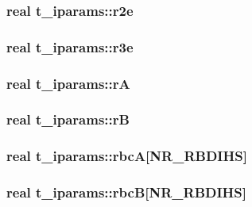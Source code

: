\hypertarget{uniont__iparams_a70a44f4e45a7d84efd330354ba816780}{
\subsubsection[{r2e}]{\setlength{\rightskip}{0pt plus 5cm}real {\bf t\-\_\-iparams\-::r2e}}}\label{uniont__iparams_a70a44f4e45a7d84efd330354ba816780}
\hypertarget{uniont__iparams_ad7f21f15de2058adad587fa20a745762}{
\subsubsection[{r3e}]{\setlength{\rightskip}{0pt plus 5cm}real {\bf t\-\_\-iparams\-::r3e}}}\label{uniont__iparams_ad7f21f15de2058adad587fa20a745762}
\hypertarget{uniont__iparams_a140d0cfa7716976087a09c992fce9826}{
\subsubsection[{r\-A}]{\setlength{\rightskip}{0pt plus 5cm}real {\bf t\-\_\-iparams\-::r\-A}}}\label{uniont__iparams_a140d0cfa7716976087a09c992fce9826}
\hypertarget{uniont__iparams_a201b81e15b8da67bf64b6fa4634df60d}{
\subsubsection[{r\-B}]{\setlength{\rightskip}{0pt plus 5cm}real {\bf t\-\_\-iparams\-::r\-B}}}\label{uniont__iparams_a201b81e15b8da67bf64b6fa4634df60d}
\hypertarget{uniont__iparams_ac5aa44c3cfa9ca81e5298d73ef1a2ba5}{
\subsubsection[{rbc\-A}]{\setlength{\rightskip}{0pt plus 5cm}real {\bf t\-\_\-iparams\-::rbc\-A}\mbox{[}{\bf \-N\-R\-\_\-\-R\-B\-D\-I\-H\-S}\mbox{]}}}\label{uniont__iparams_ac5aa44c3cfa9ca81e5298d73ef1a2ba5}
\hypertarget{uniont__iparams_afa9671d3716fb943b3d41b0df92ac6ae}{
\subsubsection[{rbc\-B}]{\setlength{\rightskip}{0pt plus 5cm}real {\bf t\-\_\-iparams\-::rbc\-B}\mbox{[}{\bf \-N\-R\-\_\-\-R\-B\-D\-I\-H\-S}\mbox{]}}}\label{uniont__iparams_afa9671d3716fb943b3d41b0df92ac6ae}
